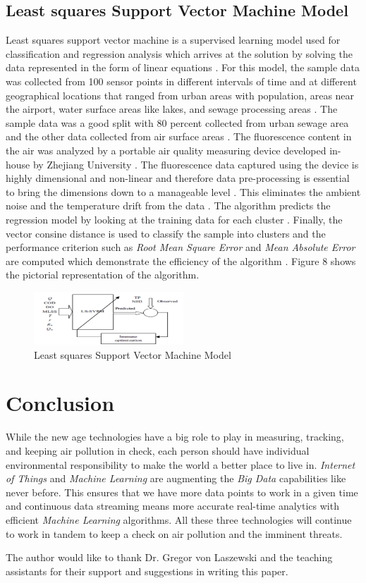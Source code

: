 \documentclass[sigconf]{acmart}
\begin{document}
\subsection{Least squares Support Vector Machine Model}
Least squares support vector machine is a supervised learning model used for classification and regression analysis which arrives at the solution by solving the data represented in the form of linear equations \cite{gagan2017}. For this model, the sample data was collected from 100 sensor points in different intervals of time and at different geographical locations that ranged from urban areas with population, areas near the airport, water surface areas like lakes, and sewage processing areas \cite{gagan2017}. The sample data was a good split with 80 percent collected from urban sewage area and the other data collected from air surface areas \cite{gagan2017}. The fluorescence content in the air was analyzed by a portable air quality measuring device developed in-house by Zhejiang University \cite{gagan2017}. The fluorescence data captured using the device is highly dimensional and non-linear and therefore data pre-processing is essential to bring the dimensions down to a manageable level \cite{gagan2017}. This eliminates the ambient noise and the temperature drift from the data \cite{gagan2017}. The algorithm predicts the regression model by looking at the training data for each cluster \cite{gagan2017}. Finally, the vector consine distance is used to classify the sample into clusters and the performance criterion such as {\em Root Mean Square Error}  and {\em Mean Absolute Error} are computed which demonstrate the efficiency of the algorithm \cite{gagan2017}. Figure 8 shows the pictorial representation of the algorithm.

\begin{figure}
\includegraphics[width=0.5\textwidth]{images/fig8.png}
\caption{Least squares Support Vector Machine Model \cite{gagan2017}}
\end{figure}

\section{Conclusion}
While the new age technologies have a big role to play in measuring, tracking, and keeping air pollution in check, each person should have individual environmental responsibility to make the world a better place to live in. {\em Internet of Things} and {\em Machine Learning} are augmenting the {\em Big Data} capabilities like never before. This ensures that we have more data points to work in a given time and continuous data streaming means more accurate real-time analytics with efficient {\em Machine Learning} algorithms. All these three technologies will continue to work in tandem to keep a check on air pollution and the imminent threats.

\begin{acks}

The author would like to thank Dr. Gregor von Laszewski and the teaching assistants for their support and suggestions in writing this paper.

\end{acks}


 
\end{document}
